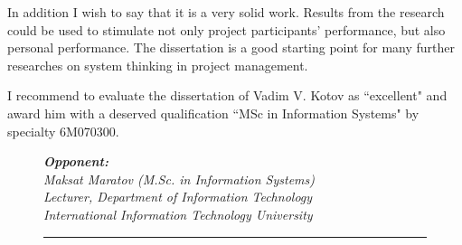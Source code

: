 \begin{titlepage}
    In addition I wish to say that it is a very solid work. Results from the research could be used to stimulate not only project participants' performance, but also personal performance. The dissertation is a good starting point for many further researches on system thinking in project management.
    
    I recommend to evaluate the dissertation of Vadim V. Kotov as ``excellent" and award him with a deserved qualification ``MSc in Information Systems" by specialty 6M070300.

        \begin{figure}[ht]
            \begin{minipage}[t]{0.7\linewidth}{\em \small
                {\bf Opponent: }\\
                Maksat Maratov (M.Sc. in Information Systems)\\
                Lecturer, Department of Information Technology\\
                International Information Technology University
                \vspace{14pt}
                
                \rule{13em}{0.4pt}\\
                }
            \end{minipage}
        \end{figure}
        
    \end{titlepage}
